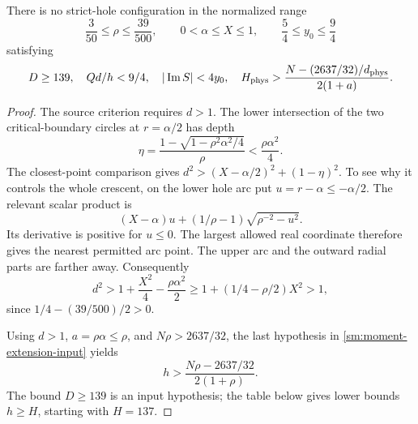 \begin{lemma}\label{sm:T-moment-extension}
There is no strict-hole configuration in the normalized
range
\[
 \frac3{50}\le\rho\le\frac{39}{500},\qquad
 0<\alpha\le X\le1,\qquad \frac54\le y_0\le\frac94
\]
satisfying
\begin{equation}\label{sm:moment-extension-input}
 D\ge139,\quad Qd/h<9/4,\quad |\Im S|<4y_0,\quad
 H_{\rm phys}>
 \frac{N-(2637/32)/d_{\rm phys}}{2(1+a)}.
\end{equation}
\end{lemma}
\begin{proof}
The source criterion requires $d>1$. The lower intersection of the two
critical-boundary circles at $r=\alpha/2$ has depth
\[
 \eta=\frac{1-\sqrt{1-\rho^2\alpha^2/4}}{\rho}
      <\frac{\rho\alpha^2}{4}.
\]
The closest-point comparison gives
$d^2>(X-\alpha/2)^2+(1-\eta)^2$.
To see why it controls the whole crescent, on the lower hole arc put
$u=r-\alpha\le-\alpha/2$. The relevant scalar product is
\[
 (X-\alpha)u+(1/\rho-1)\sqrt{\rho^{-2}-u^2}.
\]
Its derivative is positive for $u\le0$. The largest allowed real
coordinate therefore gives the nearest permitted arc point.
The upper arc and the outward radial parts are farther away.
Consequently
\[
 d^2>1+\frac{X^2}{4}-\frac{\rho\alpha^2}{2}
 \ge1+(1/4-\rho/2)X^2>1,
\]
since $1/4-(39/500)/2>0$.

Using $d>1$, $a=\rho\alpha\le\rho$, and $N\rho>2637/32$,
the last hypothesis in \eqref{sm:moment-extension-input} yields
\begin{equation}\label{sm:moment-extension-field}
 h>\frac{N\rho-2637/32}{2(1+\rho)}.
\end{equation}
The bound $D\ge139$ is an input hypothesis; the table below gives
lower bounds $h\ge H$, starting with $H=137$.


\end{proof}
